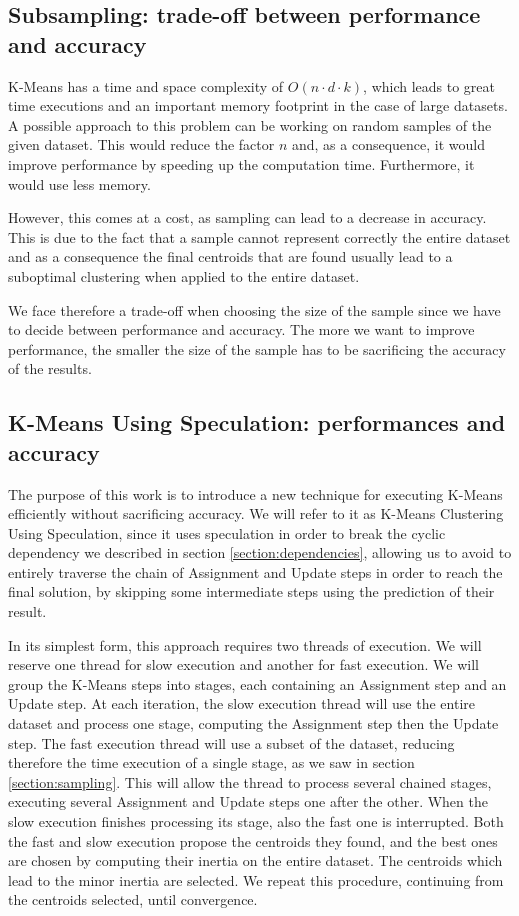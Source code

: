 \label{section:dependencies}

\subsection{Subsampling: trade-off between performance and accuracy}

K-Means has a time and space complexity of $O(n\cdot d\cdot k)$, which leads to great time executions and an important memory footprint in the case of large datasets. 
A possible approach to this problem can be working on random samples of the given dataset. This would reduce the factor $n$ and, as a consequence, it would improve performance by speeding up the computation time. Furthermore, it would use less memory. 

However, this comes at a cost, as sampling can lead to a decrease in accuracy. This is due to the fact that a sample cannot represent correctly the entire dataset and as a consequence the final centroids that are found usually lead to a suboptimal clustering when applied to the entire dataset.

We face therefore a trade-off when choosing the size of the sample since we have to decide between performance and accuracy. The more we want to improve performance, the smaller the size of the sample has to be sacrificing the accuracy of the results.
\label{section:sampling}

\subsection{K-Means Using Speculation: performances and accuracy}

The purpose of this work is to introduce a new technique for executing K-Means efficiently without sacrificing accuracy. We will refer to it as K-Means Clustering Using Speculation, since it uses speculation in order to break the cyclic dependency we described in section \ref{section:dependencies}, allowing us to avoid to entirely traverse the chain of Assignment and Update steps in order to reach the final solution, by skipping some intermediate steps using the prediction of their result.  

In its simplest form, this approach requires two threads of execution. We will reserve one thread for slow execution and another for fast execution. We will group the K-Means steps into stages, each containing an Assignment step and an Update step. At each iteration, the slow execution thread will use the entire dataset and process one stage, computing the Assignment step then the Update step. The fast execution thread will use a subset of the dataset, reducing therefore the time execution of a single stage, as we saw in section \ref{section:sampling}. This will allow the thread to process several chained stages, executing several Assignment and Update steps one after the other.
When the slow execution finishes processing its stage, also the fast one is interrupted.
Both the fast and slow execution propose the centroids they found, and the best ones are chosen by computing their inertia on the entire dataset. The centroids which lead to the minor inertia are selected.
We repeat this procedure, continuing from the centroids selected, until convergence.

